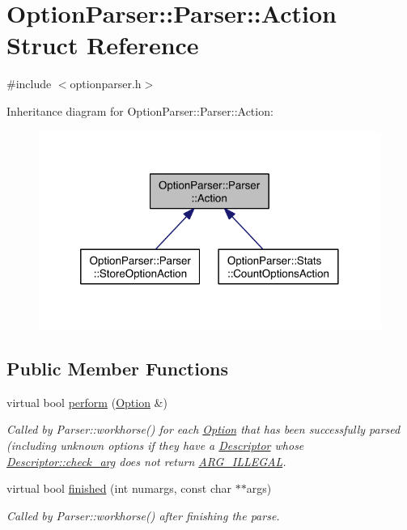 \hypertarget{struct_option_parser_1_1_parser_1_1_action}{\section{Option\-Parser\-:\-:Parser\-:\-:Action Struct Reference}
\label{struct_option_parser_1_1_parser_1_1_action}
}


{\ttfamily \#include $<$optionparser.\-h$>$}



Inheritance diagram for Option\-Parser\-:\-:Parser\-:\-:Action\-:\nopagebreak
\begin{figure}[H]
\begin{center}
\leavevmode
\includegraphics[width=317pt]{struct_option_parser_1_1_parser_1_1_action__inherit__graph}
\end{center}
\end{figure}
\subsection*{Public Member Functions}
\begin{DoxyCompactItemize}
\item 
virtual bool \hyperlink{struct_option_parser_1_1_parser_1_1_action_a04eafe7666fd69e0a84a0aac118ccb8a}{perform} (\hyperlink{class_option_parser_1_1_option}{Option} \&)
\begin{DoxyCompactList}\small\item\em Called by Parser\-::workhorse() for each \hyperlink{class_option_parser_1_1_option}{Option} that has been successfully parsed (including unknown options if they have a \hyperlink{struct_option_parser_1_1_descriptor}{Descriptor} whose \hyperlink{struct_option_parser_1_1_descriptor_aac19c7bd3a84282211edd0331c92a44a}{Descriptor\-::check\-\_\-arg} does not return \hyperlink{namespace_option_parser_ad237d47d58c66dea8dcf4f53ac11a6e4a6ea016ff6334ed0d2ec885e96a76c472}{A\-R\-G\-\_\-\-I\-L\-L\-E\-G\-A\-L}. \end{DoxyCompactList}\item 
virtual bool \hyperlink{struct_option_parser_1_1_parser_1_1_action_a71c18d0a3b8d66262eacc32f35f58165}{finished} (int numargs, const char $\ast$$\ast$args)
\begin{DoxyCompactList}\small\item\em Called by Parser\-::workhorse() after finishing the parse. \end{DoxyCompactList}\end{DoxyCompactItemize}


